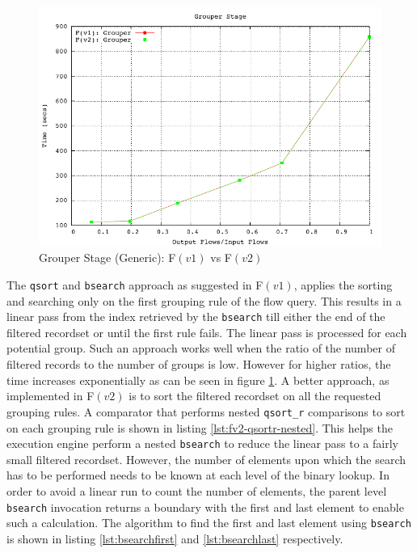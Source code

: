 \begin{figure}[h!]
  \begin{center}
    \includegraphics*
    [width=0.8\linewidth]{figures/benchmarks/grouper-fv1-fv2-bsearch}
    \caption{Grouper Stage (Generic): F$(v1)$ vs F$(v2)$}
    \label{fig:fv1-fv2-grouper-bsearch}
  \end{center}
\end{figure}

The \texttt{qsort} and \texttt{bsearch} approach as suggested in F$(v1)$,
applies the sorting and searching only on the first grouping rule of the flow
query. This results in a linear pass from the index retrieved by the
\texttt{bsearch} till either the end of the filtered recordset or until the
first rule fails. The linear pass is processed for each potential group. Such
an approach works well when  the
ratio of the number of filtered records to the number of groups is low.
However for higher ratios, the time increases exponentially as can be seen in
figure \ref{fig:fv1-fv2-grouper-bsearch}. A better approach, as implemented in
F$(v2)$ is to sort the filtered recordset on all the requested grouping rules.
A comparator that performs nested \texttt{qsort\_r} comparisons to sort on
each grouping rule is shown in listing \ref{lst:fv2-qsortr-nested}. This helps
the execution engine perform a nested \texttt{bsearch} to reduce the linear
pass to a fairly small filtered recordset. However, the number of elements
upon which the search has to be performed needs to be known at each level of
the binary lookup. In order to avoid a linear run to count the number of
elements, the parent level \texttt{bsearch} invocation returns a boundary with
the first and last element to enable such a calculation. The algorithm to find
the first and last element using \texttt{bsearch} is shown in listing
\ref{lst:bsearchfirst} and \ref{lst:bsearchlast} respectively.


